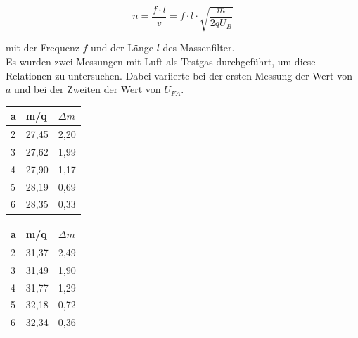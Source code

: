 \begin{equation}
n = \frac{f\cdot l}{v}= f\cdot l \cdot \sqrt{\frac{m}{2qU_B}}
\end{equation}

mit der Frequenz $f$ und der Länge $l$ des Massenfilter.\\
Es wurden zwei Messungen mit Luft als Testgas durchgeführt, um diese Relationen zu untersuchen. Dabei variierte bei der ersten Messung der Wert von $a$ und bei der Zweiten der Wert von $U_{FA}$.


\begin{center}
\begin{minipage}{0.25\textwidth}		
\begin{tabular}{l|l|l}
a & m/q & $\Delta m$\\	
\hline		
2 & 27,45 & 2,20\\
3 & 27,62 & 1,99\\
4 & 27,90 & 1,17\\
5 & 28,19 & 0,69\\
6 & 28,35 & 0,33\\
\end{tabular}
\end{minipage}
\begin{minipage}{0.25\textwidth}
\begin{tabular}{l|l|l}
a & m/q & $\Delta m$\\
\hline
2 &	31,37 &	2,49\\
3 & 31,49 &	1,90\\
4 & 31,77 &	1,29\\
5 & 32,18 &	0,72\\
6 & 32,34 &	0,36\\
\end{tabular}
\end{minipage}
\end{center}

